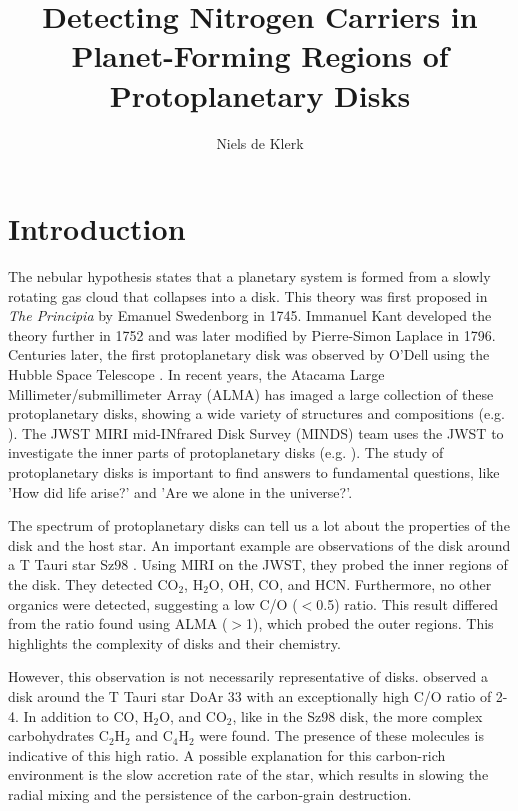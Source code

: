 \documentclass[oneside, single, authoryear, semicolon, 12pt]{lion-msc}
\title{Detecting Nitrogen Carriers in Planet-Forming Regions of Protoplanetary Disks}
\author{Niels de Klerk}
\affiliation{Leiden Observatory, Universiteit Leiden}
\date{\displaydate{date}}
\newcommand{\4}{$_4$}
\newcommand{\3}{$_3$}
\newcommand{\2}{$_2$}
\begin{document}

\maketitle

\tableofcontents
\cleardoublepage
{}
\chapter{Introduction}
The nebular hypothesis states that a planetary system is formed from a slowly rotating gas cloud that collapses into a disk. This theory was first proposed in \textit{The Principia} by Emanuel Swedenborg in 1745. Immanuel Kant developed the theory further in 1752 and was later modified by Pierre-Simon Laplace in 1796. Centuries later, the first protoplanetary disk was observed by O'Dell using the Hubble Space Telescope \citep{ODell1993}. In recent years, the Atacama Large Millimeter/submillimeter Array (ALMA) has imaged a large collection of these protoplanetary disks, showing a wide variety of structures and compositions (e.g. \cite{gardner2025exoalmaxialmaobservations, shoshi2025alma2dsuperresolutionimaging}). The JWST MIRI mid-INfrared Disk Survey (MINDS) team uses the JWST to investigate the inner parts of protoplanetary disks (e.g. \cite{Arabhavi_2025, Vlasblom_2025}). The study of protoplanetary disks is important to find answers to fundamental questions, like 'How did life arise?' and 'Are we alone in the universe?'.

The spectrum of protoplanetary disks can tell us a lot about the properties of the disk and the host star. An important example are observations of the disk around a T Tauri star Sz98 \citep{Gasman_2023}. Using MIRI on the JWST, they probed the inner regions of the disk. They detected CO$_2$, H$_2$O, OH, CO, and HCN. Furthermore, no other organics were detected, suggesting a low C/O ($<$0.5) ratio. This result differed from the ratio found using ALMA ($>$1), which probed the outer regions. This highlights the complexity of disks and their chemistry.

However, this observation is not necessarily representative of disks. \cite{colmenares2024jwstmiridetectioncarbonrichchemistry} observed a disk around the T Tauri star DoAr 33 with an exceptionally high C/O ratio of 2-4. In addition to CO, H\2O, and CO\2, like in the Sz98 disk, the more complex carbohydrates C\2H\2 and C\4H\2 were found. The presence of these molecules is indicative of this high ratio. A possible explanation for this carbon-rich environment is the slow accretion rate of the star, which results in slowing the radial mixing and the persistence of the carbon-grain destruction.
\end{document}
